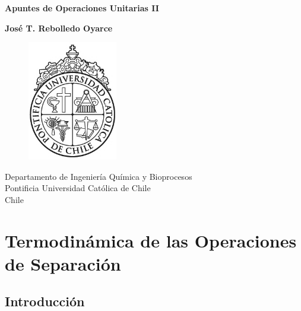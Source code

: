 \documentclass[11pt]{book}
\begin{document}
\begin{titlepage}
    \begin{center}
        \vspace*{1cm}
            
        \Huge
        \textbf{Apuntes de Operaciones Unitarias II}
            
        \vspace{4.5cm}
        
        \LARGE    
        \textbf{José T. Rebolledo Oyarce}
            
        \vfill
            
        \vspace{1.5cm}
        
        \begin{figure}[h]
        	\includegraphics[width=0.35\textwidth]{img/LogoUC.jpg}
        	\centering
		\end{figure}            
            
        \Large
        Departamento de Ingeniería Química y Bioprocesos\\
        Pontificia Universidad Católica de Chile\\
        Chile\\
            
    \end{center}
\end{titlepage}

\tableofcontents

\chapter{Termodinámica de las Operaciones de Separación}

\section{Introducción}
\end{document}
